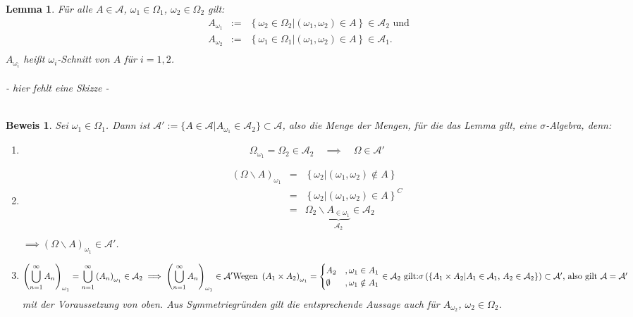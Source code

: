 \documentclass[a4paper,11pt]{book}
\def\AA{ \mathcal{A} }
\def\folgt{\ensuremath{\implies}}
\newtheorem{Lem}[Sa]{Lemma}
\theoremstyle{nonumberplain}
\newtheorem{Bew}{Beweis}
\begin{document}
\begin{Lem} Für alle $A\in\AA$, $\omega_1\in\Omega_1$, $\omega_2\in\Omega_2$ gilt: \\
\begin{eqnarray*}
A_{\omega_1} &:=& \left\{\omega_2\in\Omega_2|\left(\omega_1,\omega_2\right)\in A\right\}\in\AA_2 \text{ und} \\
A_{\omega_2} &:=& \left\{\omega_1\in\Omega_1|\left(\omega_1,\omega_2\right)\in A\right\}\in\AA_1 \text{.} \\
\end{eqnarray*}
$A_{\omega_i}$ heißt $\omega_i$-Schnitt von $A$ für $i=1,2$. \\
\quad\\
- hier fehlt eine Skizze - \\ %
\quad\\
\end{Lem}
\begin{Bew} Sei $\omega_1\in\Omega_1$. Dann ist $\AA':=\{A\in\AA|A_{\omega_1}\in\AA_2\}\subset\AA$, also die Menge der Mengen, für die das Lemma gilt, eine $\sigma$-Algebra, denn:
\begin{enumerate}
\item[(i)] \begin{displaymath} \Omega_{\omega_1}=\Omega_2\in\AA_2\quad\folgt\quad\Omega\in\AA' \end{displaymath}
\item[(ii)]\begin{eqnarray*}
\left(\Omega\backslash A\right)_{\omega_1} &=& \left\{\omega_2|\left(\omega_1,\omega_2\right)\notin A\right\} \\
 &=& \left\{\omega_2|\left(\omega_1,\omega_2\right)\in A\right\}^C \\
 &=& \Omega_2\backslash\underbrace{A_{\in\omega_1}}_{\AA_2}\in\AA_2 \\
\end{eqnarray*} $\folgt (\Omega\backslash A)_{\omega_1}\in\AA'$.
\item[(iii)]\begin{displaymath}
\left(\bigcup_{n=1}^{\infty}A_n\right)_{\omega_1} = \bigcup_{n=1}^{\infty}\left( A_n\right)_{\omega_1}\in\AA_2 \folgt \left(\bigcup_{n=1}^{\infty}A_n\right)_{\omega_1}\in\AA' $$\\$$
\text{Wegen }\left(A_1\times A_2\right)_{\omega_1}= 
\begin{cases}
A_2 & ,\omega_1\in A_1 \\
\emptyset & ,\omega_1\notin A_1 \\
\end{cases}
\in\AA_2 \text{ gilt:}$$\\$$
\sigma\left(\left\{A_1\times A_2|A_1\in\AA_1\text{, }A_2\in\AA_2\right\}\right)\subset\AA'\text{, also gilt }\AA=\AA'
\end{displaymath}
mit der Voraussetzung von oben. Aus Symmetriegründen gilt die entsprechende Aussage auch für $A_{\omega_2}$, $\omega_2\in\Omega_2$.
\end{enumerate}
\end{Bew}
\end{document}
